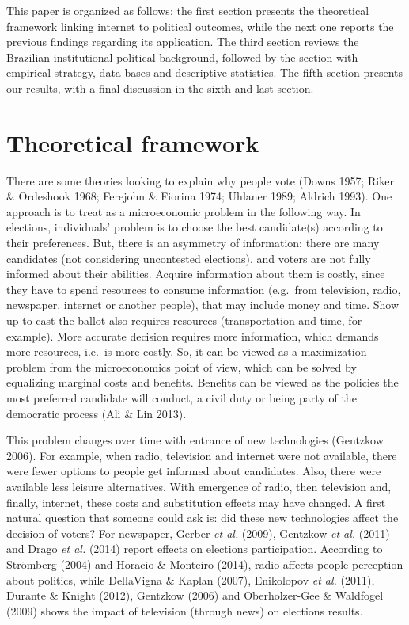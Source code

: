 \documentclass[
  12pt,
]{article}
\begin{document}
This paper is organized as follows: the first section presents the
theoretical framework linking internet to political outcomes, while the
next one reports the previous findings regarding its application. The
third section reviews the Brazilian institutional political background,
followed by the section with empirical strategy, data bases and
descriptive statistics. The fifth section presents our results, with a
final discussion in the sixth and last section.

\hypertarget{theoretical-framework}{%
\section{Theoretical framework}\label{theoretical-framework}}

There are some theories looking to explain why people vote (Downs 1957;
Riker \& Ordeshook 1968; Ferejohn \& Fiorina 1974; Uhlaner 1989; Aldrich
1993). One approach is to treat as a microeconomic problem in the
following way. In elections, individuals' problem is to choose the best
candidate(s) according to their preferences. But, there is an asymmetry
of information: there are many candidates (not considering uncontested
elections), and voters are not fully informed about their abilities.
Acquire information about them is costly, since they have to spend
resources to consume information (e.g.~from television, radio,
newspaper, internet or another people), that may include money and time.
Show up to cast the ballot also requires resources (transportation and
time, for example). More accurate decision requires more information,
which demands more resources, i.e.~is more costly. So, it can be viewed
as a maximization problem from the microeconomics point of view, which
can be solved by equalizing marginal costs and benefits. Benefits can be
viewed as the policies the most preferred candidate will conduct, a
civil duty or being party of the democratic process (Ali \& Lin 2013).

This problem changes over time with entrance of new technologies
(Gentzkow 2006). For example, when radio, television and internet were
not available, there were fewer options to people get informed about
candidates. Also, there were available less leisure alternatives. With
emergence of radio, then television and, finally, internet, these costs
and substitution effects may have changed. A first natural question that
someone could ask is: did these new technologies affect the decision of
voters? For newspaper, Gerber \emph{et al.} (2009), Gentzkow \emph{et
al.} (2011) and Drago \emph{et al.} (2014) report effects on elections
participation. According to Strömberg (2004) and Horacio \& Monteiro
(2014), radio affects people perception about politics, while DellaVigna
\& Kaplan (2007), Enikolopov \emph{et al.} (2011), Durante \& Knight
(2012), Gentzkow (2006) and Oberholzer-Gee \& Waldfogel (2009) shows the
impact of television (through news) on elections results.
\end{document}
